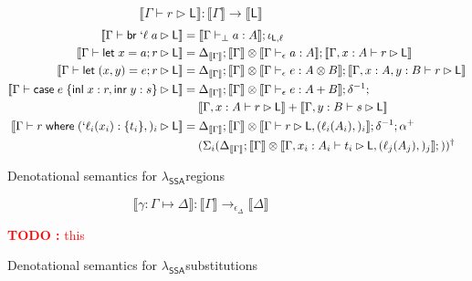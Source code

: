 \documentclass[acmsmall,screen,review]{acmart}
\newcounter{todos}
\newcommand{\TODO}[1]{{
  \stepcounter{todos}
  \begin{center}\large{\textcolor{red}{\textbf{TODO \arabic{todos}:} #1}}\end{center}
}}
\newcommand{\ms}[1]{\ensuremath{\mathsf{#1}}}
\newcommand{\lbl}[1]{{`#1}}
\newcommand{\lto}{:}
\newcommand{\linl}[1]{\ms{inl}\;{#1}}
\newcommand{\linr}[1]{\ms{inr}\;{#1}}
\newcommand{\letstmt}[3]{\ensuremath{\ms{let}\;#1 = #2; #3}}
\newcommand{\brb}[2]{\ms{br}\;#1\;#2}
\newcommand{\lbrb}[2]{\brb{\lbl{#1}}{#2}}
\newcommand{\casestmt}[5]{\ms{case}\;#1\;\{\linl{#2} \lto #3, \linr{#4} \lto #5\}}
\newcommand{\where}[2]{#1\;\ms{where}\;#2}
\newcommand{\wbranch}[3]{#1(#2) \lto \{#3\}}
\newcommand{\lwbranch}[3]{\wbranch{\lbl{#1}}{#2}{#3}}
\newcommand{\bhyp}[2]{#1 : #2}
\newcommand{\lhyp}[2]{#1(#2)}
\newcommand{\hasty}[4]{#1 \vdash_{#2} #3: {#4}}
\newcommand{\haslb}[3]{#1 \vdash #2 \rhd #3}
\newcommand{\issubst}[3]{#1: #2 \mapsto #3}
\newcommand{\dnt}[1]{\llbracket{#1}\rrbracket}
\newcommand{\isotopessa}{\(\lambda_{\ms{SSA}}\)}
\begin{document}
\begin{figure}[H]
  \begin{equation*}
    \boxed{\dnt{\haslb{\Gamma}{r}{\ms{L}}} : \dnt{\Gamma} \to \dnt{\ms{L}}}
  \end{equation*}
  \begin{align*}
    \dnt{\haslb{\Gamma}{\lbrb{\ell}{a}}{\ms{L}}} 
      &= \dnt{\hasty{\Gamma}{\bot}{a}{A}} ; \iota_{\ms{L}, \ell}
      \\
    \dnt{\haslb{\Gamma}{\letstmt{x}{a}{r}}{\ms{L}}}
      &= \Delta_{\dnt{\Gamma}}
      ; \dnt{\Gamma} \otimes \dnt{\hasty{\Gamma}{\epsilon}{a}{A}}
      ; \dnt{\haslb{\Gamma, \bhyp{x}{A}}{r}{\ms{L}}} 
      \\
    \dnt{\haslb{\Gamma}{\letstmt{(x, y)}{e}{r}}{\ms{L}}}
      &= \Delta_{\dnt{\Gamma}}
      ; \dnt{\Gamma} \otimes \dnt{\hasty{\Gamma}{\epsilon}{e}{A \otimes B}}
      ; \dnt{\haslb{\Gamma, \bhyp{x}{A}, \bhyp{y}{B}}{r}{\ms{L}}} 
      \\ 
    \dnt{\haslb{\Gamma}{\casestmt{e}{x}{r}{y}{s}}{\ms{L}}}
      &= \Delta_{\dnt{\Gamma}}
      ; \dnt{\Gamma} \otimes \dnt{\hasty{\Gamma}{\epsilon}{e}{A + B}}
      ; \delta^{-1} ;
      \\&\quad\;
      \dnt{\haslb{\Gamma, \bhyp{x}{A}}{r}{\ms{L}}}
      + \dnt{\haslb{\Gamma, \bhyp{y}{B}}{s}{\ms{L}}}
      \\
    \dnt{\haslb{\Gamma}{\where{r}{(\lwbranch{\ell_i}{x_i}{t_i},)_i}}{\ms{L}}}
      &=  
      \Delta_{\dnt{\Gamma}}
      ; \dnt{\Gamma} \otimes \dnt{\haslb{\Gamma}{r}{\ms{L}, (\lhyp{\ell_i}{A_i},)_i}} 
      ; \delta^{-1} ;
      \alpha^+_{}
      \\ &\quad\;
      (
        \Sigma_i (\Delta_{\dnt{\Gamma}} 
          ; \dnt{\Gamma} \otimes 
            \dnt{\haslb{\Gamma, \bhyp{x_i}{A_i}}{t_i}{\ms{L}, (\lhyp{\ell_j}{A_j},)_j}}
          ; 
          )
      )^\dagger
  \end{align*}
  \caption{Denotational semantics for \isotopessa regions}
  \label{fig:ssa-reg-sem}
\end{figure}

\begin{figure}[H]
  \begin{equation*}
    \boxed{\dnt{\issubst{\gamma}{\Gamma}{\Delta}} 
      : \dnt{\Gamma} \to_{\epsilon_\Delta} \dnt{\Delta}}
  \end{equation*}
  \TODO{this}
  \caption{Denotational semantics for \isotopessa substitutions}
  \label{fig:ssa-vsubst-sem} 
\end{figure}
\end{document}
